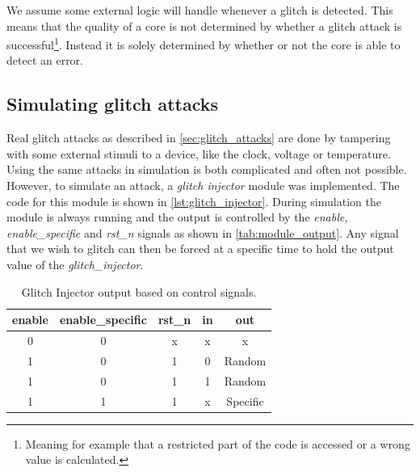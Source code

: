 We assume some external logic will handle whenever a glitch is detected. This means that the quality of a core is not determined by whether a glitch attack is successful\footnote{Meaning for example that a restricted part of the code is accessed or a wrong value is calculated.}. Instead it is solely determined by whether or not the core is able to detect an error. 

\subsection{Simulating glitch attacks}
\label{subsec:sim_glitch}

Real glitch attacks as described in \autoref{sec:glitch_attacks} are done by tampering with some external stimuli to a device, like the clock, voltage or temperature. Using the same attacks in simulation is both complicated and often not possible. However, to simulate an attack, a \textit{glitch injector} module was implemented. The code for this module is shown in \autoref{lst:glitch_injector}. During simulation the module is always running and the output is controlled by the \textit{enable, enable\_specific} and \textit{rst\_n} signals as shown in \autoref{tab:module_output}. Any signal that we wish to glitch can then be forced at a specific time to hold the output value of the \textit{glitch\_injector}.

\begin{table}[h]
\centering
\caption{Glitch Injector output based on control signals.}
\label{tab:module_output}
\begin{tabular}{ccccc}
\toprule 
\rowcolor{black!20} \textbf{enable} & \textbf{enable\_specific} & \textbf{rst\_n} & \textbf{in} & \textbf{out} \\
\midrule
0 & 0 & x & x & x \\
\rowcolor{black!20} 1 & 0 & 1 & 0 & Random \\
1 & 0 & 1 & 1 & Random \\
\rowcolor{black!20} 1 & 1 & 1 & x & Specific \\
\bottomrule
\end{tabular}
\end{table}

